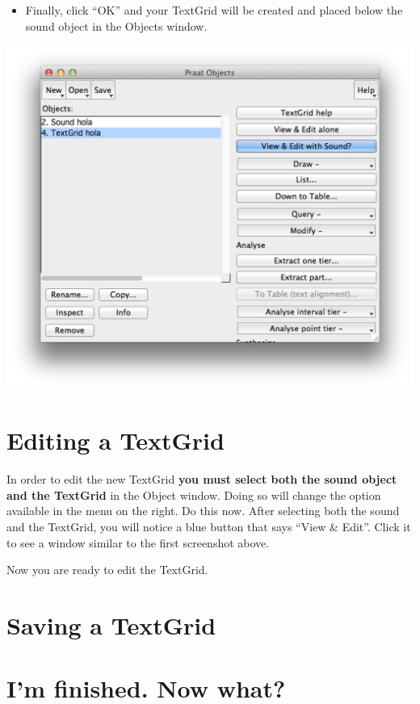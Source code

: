 \documentclass[12pt]{article}
\begin{document}
\begin{itemize}
	\item Finally, click ``OK'' and your TextGrid will be created and placed below the sound object in the Objects window.
\end{itemize}

\begin{center}
	\includegraphics[scale=.28]{tg5.png}
\end{center}

\section{Editing a TextGrid} %
\label{sec:editing_a_TextGrid}

In order to edit the new TextGrid \textbf{you must select both the sound object and the TextGrid} in the Object window. Doing so will change the option available in the menu on the right. Do this now. After selecting both the sound and the TextGrid, you will notice a blue button that says ``View \& Edit''. Click it to see a window similar to the first screenshot above.

Now you are ready to edit the TextGrid.  


\section{Saving a TextGrid} %
\label{sec:saving_a_TextGrid}



\section{I'm finished. Now what?} %
\label{sec:i_m_finished_now_what_}

\end{document}

